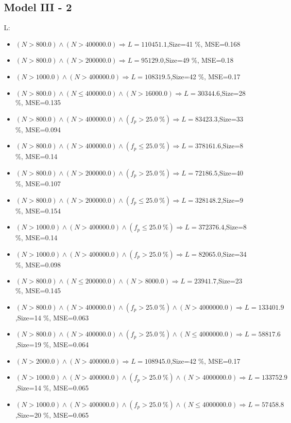 \documentclass[numbered]{CSL}
\begin{document}
\subsection{Model III - 2}
L:
\begin{itemize}
\item $(N > 800.0) \land (N > 400000.0) \Rightarrow L = 110451.1$,\hfill Size=41 \%, MSE=0.168
\item $(N > 800.0) \land (N > 200000.0) \Rightarrow L = 95129.0$,\hfill Size=49 \%, MSE=0.18
\item $(N > 1000.0) \land (N > 400000.0) \Rightarrow L = 108319.5$,\hfill Size=42 \%, MSE=0.17
\item $(N > 800.0) \land (N \leq 400000.0) \land (N > 16000.0) \Rightarrow L = 30344.6$,\hfill Size=28 \%, MSE=0.135
\item $(N > 800.0) \land (N > 400000.0) \land (f_p > 25.0~\%) \Rightarrow L = 83423.3$,\hfill Size=33 \%, MSE=0.094
\item $(N > 800.0) \land (N > 400000.0) \land (f_p \leq 25.0~\%) \Rightarrow L = 378161.6$,\hfill Size=8 \%, MSE=0.14
\item $(N > 800.0) \land (N > 200000.0) \land (f_p > 25.0~\%) \Rightarrow L = 72186.5$,\hfill Size=40 \%, MSE=0.107
\item $(N > 800.0) \land (N > 200000.0) \land (f_p \leq 25.0~\%) \Rightarrow L = 328148.2$,\hfill Size=9 \%, MSE=0.154
\item $(N > 1000.0) \land (N > 400000.0) \land (f_p \leq 25.0~\%) \Rightarrow L = 372376.4$,\hfill Size=8 \%, MSE=0.14
\item $(N > 1000.0) \land (N > 400000.0) \land (f_p > 25.0~\%) \Rightarrow L = 82065.0$,\hfill Size=34 \%, MSE=0.098
\item $(N > 800.0) \land (N \leq 200000.0) \land (N > 8000.0) \Rightarrow L = 23941.7$,\hfill Size=23 \%, MSE=0.145
\item $(N > 800.0) \land (N > 400000.0) \land (f_p > 25.0~\%) \land (N > 4000000.0) \Rightarrow L = 133401.9$,\hfill Size=14 \%, MSE=0.063
\item $(N > 800.0) \land (N > 400000.0) \land (f_p > 25.0~\%) \land (N \leq 4000000.0) \Rightarrow L = 58817.6$,\hfill Size=19 \%, MSE=0.064
\item $(N > 2000.0) \land (N > 400000.0) \Rightarrow L = 108945.0$,\hfill Size=42 \%, MSE=0.17
\item $(N > 1000.0) \land (N > 400000.0) \land (f_p > 25.0~\%) \land (N > 4000000.0) \Rightarrow L = 133752.9$,\hfill Size=14 \%, MSE=0.065
\item $(N > 1000.0) \land (N > 400000.0) \land (f_p > 25.0~\%) \land (N \leq 4000000.0) \Rightarrow L = 57458.8$,\hfill Size=20 \%, MSE=0.065

\end{itemize}
\end{document}

